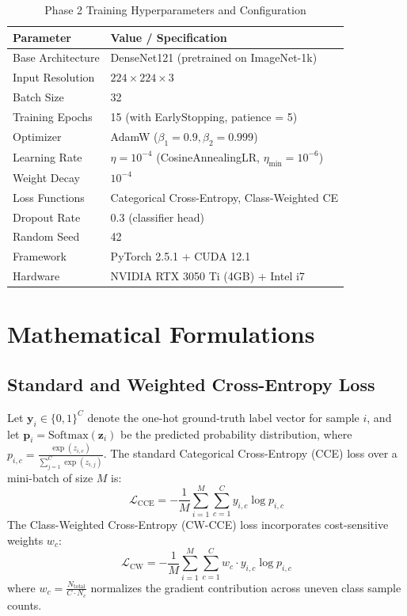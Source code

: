 \documentclass[conference]{IEEEtran}
\begin{document}
\begin{table}[!t]
\caption{Phase 2 Training Hyperparameters and Configuration}
\label{tab:hyperparams}
\centering
\begin{tabular}{ll}
\toprule
\textbf{Parameter} & \textbf{Value / Specification} \\
\midrule
Base Architecture & DenseNet121 (pretrained on ImageNet-1k) \\
Input Resolution & $224 \times 224 \times 3$ \\
Batch Size & 32 \\
Training Epochs & 15 (with EarlyStopping, patience = 5) \\
Optimizer & AdamW ($\beta_1=0.9, \beta_2=0.999$) \\
Learning Rate & $\eta = 10^{-4}$ (CosineAnnealingLR, $\eta_{\text{min}}=10^{-6}$) \\
Weight Decay & $10^{-4}$ \\
Loss Functions & Categorical Cross-Entropy, Class-Weighted CE \\
Dropout Rate & 0.3 (classifier head) \\
Random Seed & 42 \\
Framework & PyTorch 2.5.1 + CUDA 12.1 \\
Hardware & NVIDIA RTX 3050 Ti (4GB) + Intel i7 \\
\bottomrule
\end{tabular}
\end{table}

\section{Mathematical Formulations}
\subsection{Standard and Weighted Cross-Entropy Loss}
Let $\mathbf{y}_i \in \{0, 1\}^C$ denote the one-hot ground-truth label vector for sample $i$, and let $\mathbf{p}_i = \text{Softmax}(\mathbf{z}_i)$ be the predicted probability distribution, where $p_{i,c} = \frac{\exp(z_{i,c})}{\sum_{j=1}^C \exp(z_{i,j})}$. The standard Categorical Cross-Entropy (CCE) loss over a mini-batch of size $M$ is:
\begin{equation}
    \mathcal{L}_{\text{CCE}} = -\frac{1}{M} \sum_{i=1}^M \sum_{c=1}^C y_{i,c} \log p_{i,c}
\end{equation}
The Class-Weighted Cross-Entropy (CW-CCE) loss incorporates cost-sensitive weights $w_c$:
\begin{equation}
    \mathcal{L}_{\text{CW}} = -\frac{1}{M} \sum_{i=1}^M \sum_{c=1}^C w_c \cdot y_{i,c} \log p_{i,c}
\end{equation}
where $w_c = \frac{N_{\text{total}}}{C \cdot N_c}$ normalizes the gradient contribution across uneven class sample counts.
\end{document}
